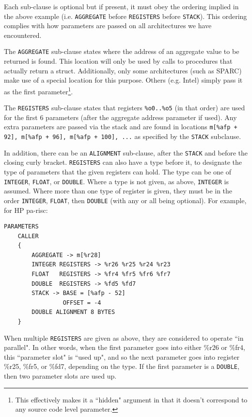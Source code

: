 Each sub-clause is optional but if present, it must obey the
ordering implied in the above example (i.e. {\tt AGGREGATE} before
{\tt REGISTERS} before {\tt STACK}). This ordering complies with
how parameters are passed on all architectures we have encountered.

The \texttt{AGGREGATE} sub-clause states where the address of an
aggregate value to be returned is found. This location will only
be used by calls to procedures that actually return a struct.
Additionally, only some architectures (such as SPARC) make use of
a special location for this purpose. Others (e.g. Intel) simply
pass it as the first parameter\footnote{This effectively makes it a
``hidden" argument in that it doesn't correspond to any source code
level parameter.}.

The {\tt REGISTERS} sub-clause states that registers {\tt \%o0..\%o5}
(in that order) are used for the first 6 parameters (after the
aggregate address parameter if used). Any extra parameters are
passed via the stack and are found in locations {\tt m[\%afp + 92],
m[\%afp + 96], m[\%afp + 100], ...} as specified by the {\tt STACK}
subclause.

In addition, there can be an {\tt ALIGNMENT} sub-clause, after the
{\tt STACK} and before the closing curly bracket. {\tt REGISTERS}
can also have a
type before it, to designate the type of parameters that the given
registers can hold. The type can be one of {\tt INTEGER}, {\tt FLOAT},
or {\tt DOUBLE}. Where a type is not given, as above, {\tt INTEGER} is
assumed. Where more than one type of register is given, they must be
in the order {\tt INTEGER}, {\tt FLOAT}, then {\tt DOUBLE} (with any or
all being optional). For example, for HP pa-risc:

\begin{verbatim}
PARAMETERS
    CALLER
    {
        AGGREGATE -> m[%r28]
        INTEGER REGISTERS -> %r26 %r25 %r24 %r23
        FLOAT   REGISTERS -> %fr4 %fr5 %fr6 %fr7
        DOUBLE  REGISTERS -> %fd5 %fd7
        STACK -> BASE = [%afp - 52]
                 OFFSET = -4
        DOUBLE ALIGNMENT 8 BYTES
    }

\end{verbatim}

When multiple {\tt REGISTERS} are given as above, they are considered to
operate ``in parallel". In other words, when the first parameter goes into
either \%r26 or \%fr4, this ``parameter slot" is ``used up", and so the next
parameter goes into register \%r25, \%fr5, or \%fd7, depending on the type.
If the first parameter is a {\tt DOUBLE}, then two parameter slots are
used up.

